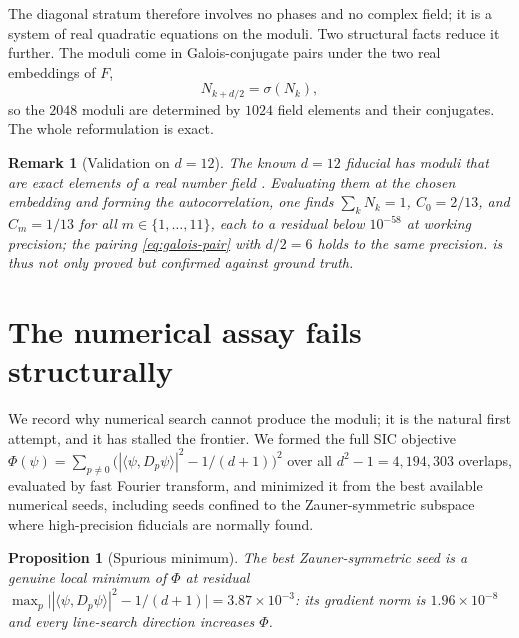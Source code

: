 \documentclass[12pt,a4paper]{article}
\newtheorem{proposition}[theorem]{Proposition}
\newtheorem{remark}[theorem]{Remark}
\newcommand{\Fd}{F}
\begin{document}
The diagonal stratum therefore involves no phases and no complex field; it is a
system of real quadratic equations on the moduli.  Two structural facts reduce it
further.  The moduli come in Galois-conjugate pairs under the two real
embeddings of $\Fd$,
\begin{equation}
\label{eq:galois-pair}
N_{k+d/2} = \sigma(N_k),
\end{equation}
so the $2048$ moduli are determined by $1024$ field elements and their
conjugates.  The whole reformulation is exact.

\begin{remark}[Validation on $d=12$]
\label{rem:d12-autocorr}
The known $d=12$ fiducial has moduli that are exact elements of a real number
field \cite{Appleby2013}.  Evaluating them at the chosen embedding and forming
the autocorrelation, one finds $\sum_k N_k = 1$, $C_0 = 2/13$, and
$C_m = 1/13$ for all $m\in\{1,\dots,11\}$, each to a residual below $10^{-58}$
at working precision; the pairing \eqref{eq:galois-pair} with $d/2=6$ holds to
the same precision.   is thus not only proved but confirmed
against ground truth.
\end{remark}

\section{The numerical assay fails structurally}
\label{sec:numeric}

We record why numerical search cannot produce the moduli; it is the natural
first attempt, and it has stalled the frontier.  We formed the full SIC objective
$\Phi(\psi) = \sum_{p\neq 0}\big(|\langle\psi,D_p\psi\rangle|^2 - 1/(d+1)\big)^2$
over all $d^2-1 = 4{,}194{,}303$ overlaps, evaluated by fast Fourier transform,
and minimized it from the best available numerical seeds, including seeds
confined to the Zauner-symmetric subspace where high-precision fiducials are
normally found.

\begin{proposition}[Spurious minimum]
\label{prop:spurious}
The best Zauner-symmetric seed is a genuine local minimum of $\Phi$ at residual
$\max_p\big||\langle\psi,D_p\psi\rangle|^2 - 1/(d+1)\big| = 3.87\times 10^{-3}$:
its gradient norm is $1.96\times 10^{-8}$ and every line-search direction
increases $\Phi$.
\end{proposition}
\end{document}
